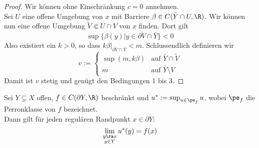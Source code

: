\begin{proof}
  Wir können ohne Einschränkung $c = 0$ annehmen. \\
  Sei $U$ eine offene Umgebung von $x$ mit Barriere $\beta \in C(\bar
  Y \cap U, \R)$. Wir können nun eine offene Umgebung $\tilde V \Subset U \cap V$
  von $x$ finden. Dort gilt
  \[
  \sup\{\beta(y)| y \in \partial \tilde V \cap \bar Y \} < 0
  \]
  Also existiert ein $k > 0$, so dass $k\beta|_{\partial \tilde V \cap
    \bar Y} < m$.
  Schlussendlich definieren wir
  \[
  v :=
  \begin{cases}
    \sup(m, k\beta) & \text{auf } \bar Y \cap \tilde V\\
    m & \text{auf } \bar Y \setminus V
  \end{cases}
  \]
  Damit ist $v$ stetig und genügt den Bedingungen 1 bis 3.
\end{proof}

\begin{lemma}
  Sei $Y \subsetneq X$ offen, $f \in C(\partial Y, \R)$ beschränkt und
  $u^\ast := \sup_{u \in \pe_f}u$, wobei $\pe_f$ die Perronklasse von
  $f$ bezeichnet. \\
  Dann gilt für jeden regulären Randpunkt $x \in \partial Y$:
  \[
  \lim_{\substack{y \ra x\\y \in Y}} u^\ast(y) = f(x)
  \]
\end{lemma}


